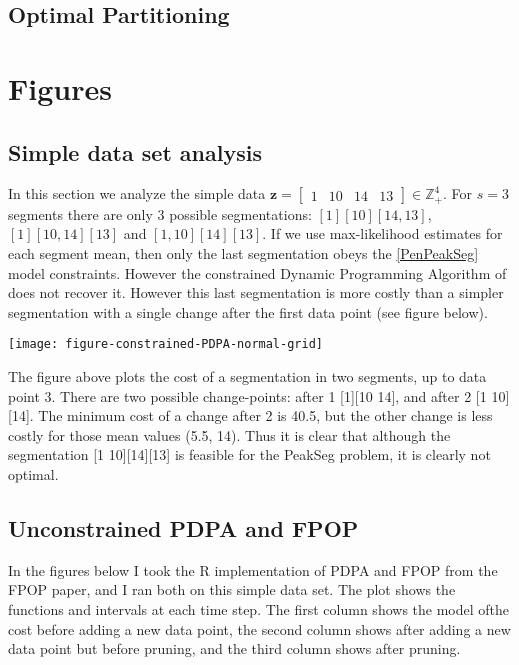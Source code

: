 \documentclass{article}
\newcommand{\ZZ}{\mathbb Z}
\begin{document}
\subsection{Optimal Partitioning}

\section{Figures}

\subsection{Simple data set analysis}

In this section we analyze the simple data
$\mathbf z = \left[\begin{array}{cccc} 1 & 10 & 14 & 13
\end{array}\right]\in\ZZ_+^4
$. For $s=3$ segments there are only 3 possible segmentations:
$[1][10][14, 13]$, $[1][10, 14][13]$ and $[1, 10][14][13]$. If we use
max-likelihood estimates for each segment mean, then only the last
segmentation obeys the \ref{PenPeakSeg} model constraints. However the
constrained Dynamic Programming Algorithm of \citet{PeakSeg} does not
recover it. However this last segmentation is more costly than a
simpler segmentation with a single change after the first data point
(see figure below).

\texttt{[image: figure-constrained-PDPA-normal-grid]}

The figure above plots the cost of a segmentation in two segments, up
to data point 3. There are two possible change-points: after 1 [1][10
14], and after 2 [1 10][14]. The minimum cost of a change after 2 is
40.5, but the other change is less costly for those mean values (5.5,
14). Thus it is clear that although the segmentation [1 10][14][13] is
feasible for the PeakSeg problem, it is clearly not optimal.

\subsection{Unconstrained PDPA and FPOP}

In the figures below I took the R implementation of PDPA and FPOP from
the FPOP paper, and I ran both on this simple data set. The plot shows
the functions and intervals at each time step. The first column shows
the model ofthe cost before adding a new data point, the second column
shows after adding a new data point but before pruning, and the third
column shows after pruning.
\end{document}
